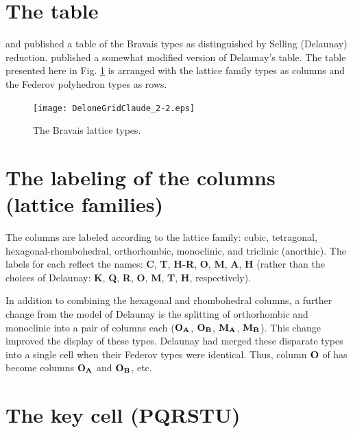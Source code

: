 \documentclass[preprint]{iucr}              %
\numberwithin{equation}{section}
\begin{document}
		
	
\section{The table}

	 and  published a table of the Bravais types
	as distinguished by Selling (Delaunay) reduction.\cite{andrews2023measuring} published
	a somewhat modified version of Delaunay's table. The table presented here in Fig. \ref{grid}
	is arranged with the lattice family types as columns and the Federov polyhedron
	types \cite{fedorov1891symmetry} \cite{fedorov1885elements} as rows.
		\begin{figure}
		\texttt{[image: DeloneGridClaude\_2-2.eps]}
		\label{grid}
		\caption{The  Bravais lattice types.}
	    \end{figure}
	
\section{The labeling of the columns (lattice families)}
	
	The columns are labeled according to the lattice family: cubic,
	tetragonal, hexagonal-rhombohedral, orthorhombic, monoclinic, and
	triclinic (anorthic). The labels for each reflect the names:
	\textbf{C}, \textbf{T}, \textbf{H-R}, \textbf{O},\textbf{ M}, \textbf{A}, \textbf{H} (rather than the choices of Delaunay: 
        \textbf{K}, \textbf{Q},	\textbf{R},\textbf{ O},\textbf{ M}, \textbf{T}, \textbf{H}, respectively).
	
	In addition to combining the hexagonal and rhombohedral columns,
	a further change from the model of Delaunay is the splitting 
	of orthorhombic and monoclinic into a pair of columns each
	($\bf{O_A}$, $\bf{O_B}$, $\bf{M_A}$, $\bf{M_B}$). This change 
	improved the display of these types. Delaunay had merged these
	disparate types into a single cell when their Federov
	types were identical. Thus, column $\bf{O}$ of 
	has become columns $\bf{O_A}$ and $\bf{O_B}$, etc.
		
\section{The key cell (PQRSTU)}
\end{document}
